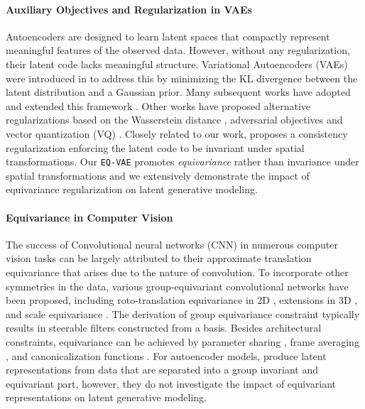 \paragraph{Auxiliary Objectives and Regularization in VAEs}
 Autoencoders are designed to learn latent spaces that compactly represent meaningful features of the observed data. However, without any regularization, their latent code lacks meaningful structure. Variational Autoencoders (VAEs) were introduced in \citet{kingma2014} to address this by minimizing the KL divergence between the latent distribution and a Gaussian prior. Many subsequent works have adopted and extended this framework \cite{Higgins2016betaVAELB, dilokthanakul2016deep, tomczak2018vae, takahashi2019variational}.
Other works have proposed alternative regularizations based on the Wasserstein distance \cite{tolstikhin2018wasserstein, kolouri2018sliced}, adversarial objectives \cite{zhao2018adversa, makhzani2015adversarial} and vector quantization (VQ) \cite{oord2017vq}. Closely related to our work, \citet{NEURIPS2021_6c19e0a6} proposes a consistency regularization enforcing the latent code to be invariant under spatial transformations.  Our \texttt{EQ-VAE} promotes \emph{equivariance} rather than invariance under spatial transformations and we extensively demonstrate the impact of equivariance regularization on latent generative modeling.


\paragraph{Equivariance in Computer Vision} The success of Convolutional neural networks (CNN) in numerous computer vision tasks can be largely attributed to their approximate translation equivariance that arises due to the nature of convolution.
To incorporate other symmetries in the data, various group-equivariant convolutional networks have been proposed, including roto-translation equivariance in 2D \cite{cohen2016group, hoogeboom2018hexaconv, weiler2019general}, extensions in 3D \cite{worrall2018cubenet, thomas2018tensor, kondor2018n}, and scale equivariance \cite{rahman2023truly, Sosnovik2020Scale-Equivariant}. The derivation of group equivariance constraint typically results in steerable filters constructed from a basis. Besides architectural constraints, equivariance can be achieved by parameter sharing \cite{ravanbakhsh2017equivariance}, frame averaging \cite{puny2022frame}, and canonicalization functions \cite{kaba2023equivariance}.  For autoencoder models, \citet{winter2022unsupervised} produce latent representations from data
that are separated into a group invariant and equivariant part, however, they do not investigate the impact of equivariant representations on latent generative modeling.
